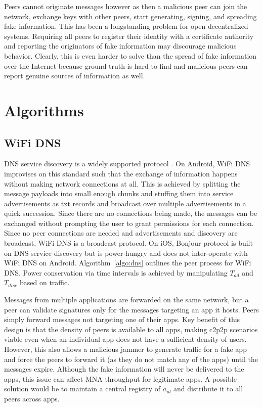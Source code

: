 \documentclass[conference]{IEEEtran}
\begin{document}
Peers cannot originate messages however as then a malicious peer can
join the network, exchange keys with other peers, start generating,
signing, and spreading fake information. This has been a longstanding
problem for open decentralized systems. Requiring all peers to
register their identity with a certificate authority and reporting the
originators of fake information may discourage malicious behavior.
Clearly, this is even harder to solve than the spread of fake
information over the Internet because ground truth is hard to find and
malicious peers can report genuine sources of information as well.
%
\section{Algorithms}
\label{sec:algo}
%
\subsection{WiFi DNS}
\label{sec:wifi}
%
DNS service discovery is a widely supported protocol
\cite{cheshire-dns-sd-2013}. On Android, WiFi DNS improvises on this
standard such that the exchange of information happens without making
network connections at all. This is achieved by splitting the message
payloads into small enough chunks and stuffing them into service
advertisements as txt records and broadcast over multiple
advertisements in a quick succession. Since there are no connections
being made, the messages can be exchanged without prompting the user
to grant permissions for each connection. Since no peer connections
are needed and advertisements and discovery are broadcast, WiFi DNS is
a broadcast protocol. On iOS, Bonjour protocol is built on DNS service
discovery but is power-hungry and does not inter-operate with WiFi DNS
on Android. Algorithm~\ref{algo:dns} outlines the peer process for
WiFi DNS. Power conservation via time intervals is achieved by
manipulating $T_{ad}$ and $T_{disc}$ based on traffic. 

Messages from multiple applications are forwarded on the same network,
but a peer can validate signatures only for the messages targeting an
app it hosts. Peers simply forward messages not targeting one of their
apps. Key benefit of this design is that the density of peers is
available to all apps, making c2p2p scenarios viable even when an
individual app does not have a sufficient density of users.  However,
this also allows a malicious jammer to generate traffic for a fake
app and force the peers to forward it (as they do not match any of the
apps) until the messages expire.  Although the fake information will
never be delivered to the apps, this issue can affect MNA throughput
for legitimate apps. A possible solution would be to maintain a
central registry of $a_{id}$ and distribute it to all peers across
apps.
\end{document}
